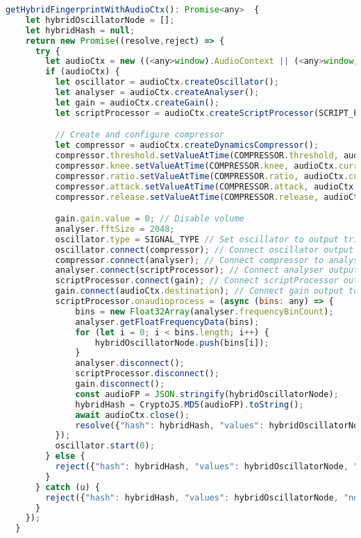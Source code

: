 \begin{lstlisting}[language=JavaScript, caption=Hybrid fingerprint generation code, label=hybridFingerprintGenerationCode]
  getHybridFingerprintWithAudioCtx(): Promise<any>  {
    let hybridOscillatorNode = [];
    let hybridHash = null;
    return new Promise((resolve,reject) => {
      try {
        let audioCtx = new ((<any>window).AudioContext || (<any>window).webkitAudioContext)();
        if (audioCtx) {
          let oscillator = audioCtx.createOscillator();
          let analyser = audioCtx.createAnalyser();
          let gain = audioCtx.createGain();
          let scriptProcessor = audioCtx.createScriptProcessor(SCRIPT_PROCESSOR.bufferSize, SCRIPT_PROCESSOR.numberOfInputChannels, SCRIPT_PROCESSOR.numberOfOutputChannels);

          // Create and configure compressor
          let compressor = audioCtx.createDynamicsCompressor();
          compressor.threshold.setValueAtTime(COMPRESSOR.threshold, audioCtx.currentTime);
          compressor.knee.setValueAtTime(COMPRESSOR.knee, audioCtx.currentTime);
          compressor.ratio.setValueAtTime(COMPRESSOR.ratio, audioCtx.currentTime);
          compressor.attack.setValueAtTime(COMPRESSOR.attack, audioCtx.currentTime);
          compressor.release.setValueAtTime(COMPRESSOR.release, audioCtx.currentTime);

          gain.gain.value = 0; // Disable volume
          analyser.fftSize = 2048;
          oscillator.type = SIGNAL_TYPE // Set oscillator to output triangle wave
          oscillator.connect(compressor); // Connect oscillator output to dynamic compressor
          compressor.connect(analyser); // Connect compressor to analyser
          analyser.connect(scriptProcessor); // Connect analyser output to scriptProcessor input
          scriptProcessor.connect(gain); // Connect scriptProcessor output to gain input
          gain.connect(audioCtx.destination); // Connect gain output to audiocontext destination
          scriptProcessor.onaudioprocess = (async (bins: any) => {
              bins = new Float32Array(analyser.frequencyBinCount);
              analyser.getFloatFrequencyData(bins);
              for (let i = 0; i < bins.length; i++) {
                  hybridOscillatorNode.push(bins[i]);
              }
              analyser.disconnect();
              scriptProcessor.disconnect();
              gain.disconnect();
              const audioFP = JSON.stringify(hybridOscillatorNode);
              hybridHash = CryptoJS.MD5(audioFP).toString();
              await audioCtx.close();
              resolve({"hash": hybridHash, "values": hybridOscillatorNode, "noFingerprint": false});
          });
          oscillator.start(0);
        } else {
          reject({"hash": hybridHash, "values": hybridOscillatorNode, "noFingerprint": true});
        }
      } catch (u) {
        reject({"hash": hybridHash, "values": hybridOscillatorNode, "noFingerprint": true});
      }
    });
  }
\end{lstlisting}


